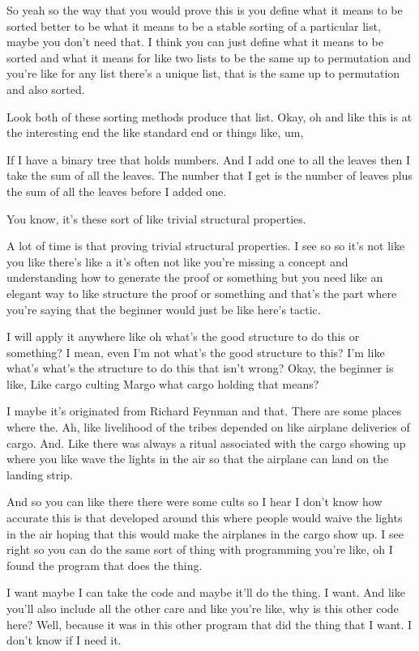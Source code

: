 So yeah so the way that you would prove this is you define what it means to be sorted better to be what it means to be a stable sorting of a particular list, maybe you don't need that. I think you can just define what it means to be sorted and what it means for like two lists to be the same up to permutation and you're like for any list there's a unique list, that is the same up to permutation and also sorted. 

Look both of these sorting methods produce that list. Okay, oh and like this is at the interesting end the like standard end or things like, um, 

If I have a binary tree that holds numbers. And I add one to all the leaves then I take the sum of all the leaves. The number that I get is the number of leaves plus the sum of all the leaves before I added one. 

You know, it's these sort of like trivial structural properties. 

A lot of time is that proving trivial structural properties. I see so so it's not like you like there's like a it's often not like you're missing a concept and understanding how to generate the proof or something but you need like an elegant way to like structure the proof or something and that's the part where you're saying that the beginner would just be like here's tactic. 

I will apply it anywhere like oh what's the good structure to do this or something? I mean, even I'm not what's the good structure to this? I'm like what's what's the structure to do this that isn't wrong? Okay, the beginner is like, Like cargo culting Margo what cargo holding that means? 

I maybe it's originated from Richard Feynman and that. There are some places where the. Ah, like livelihood of the tribes depended on like airplane deliveries of cargo. And. Like there was always a ritual associated with the cargo showing up where you like wave the lights in the air so that the airplane can land on the landing strip. 

And so you can like there there were some cults so I hear I don't know how accurate this is that developed around this where people would waive the lights in the air hoping that this would make the airplanes in the cargo show up. I see right so you can do the same sort of thing with programming you're like, oh I found the program that does the thing. 

I want maybe I can take the code and maybe it'll do the thing. I want. And like you'll also include all the other care and like you're like, why is this other code here? Well, because it was in this other program that did the thing that I want. I don't know if I need it. 

